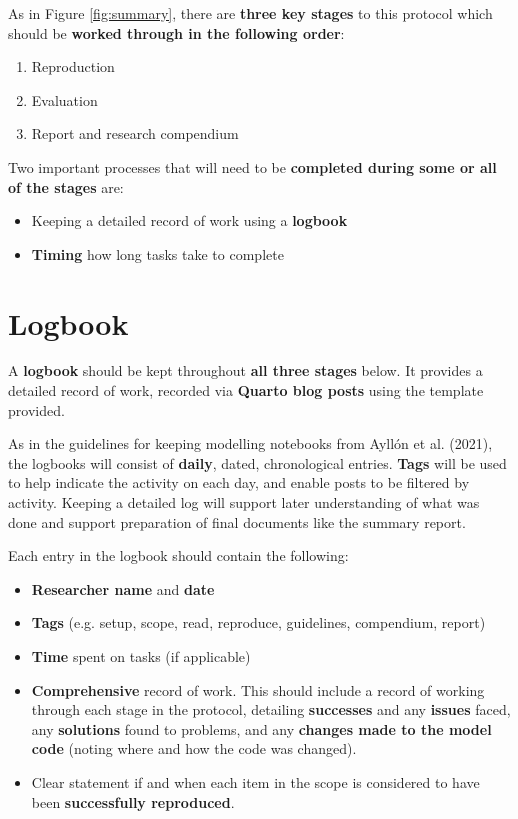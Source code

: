 As in Figure \ref{fig:summary}, there are \textbf{three key stages} to this protocol which should be \textbf{worked through in the following order}:
\begin{enumerate}
    \item Reproduction
    \item Evaluation
    \item Report and research compendium
\end{enumerate}

Two important processes that will need to be \textbf{completed during some or all of the stages} are:
\begin{itemize}
    \item Keeping a detailed record of work using a \textbf{logbook}
    \item \textbf{Timing} how long tasks take to complete
\end{itemize}

\vspace{1cm}
\section{Logbook}

A \textbf{logbook} should be kept throughout \textbf{all three stages} below. It provides a detailed record of work, recorded via \textbf{Quarto blog posts} using the template provided.\autocite{heather_template_2024}

As in the guidelines for keeping modelling notebooks from Ayllón et al. (2021),\autocite{ayllon_keeping_2021} the logbooks will consist of \textbf{daily}, dated, chronological entries. \textbf{Tags} will be used to help indicate the activity on each day, and enable posts to be filtered by activity.\autocite{ayllon_keeping_2021} Keeping a detailed log will support later understanding of what was done and support preparation of final documents like the summary report.

Each entry in the logbook should contain the following:
\begin{itemize}
    \item \textbf{Researcher name} and \textbf{date}
    \item \textbf{Tags} (e.g. setup, scope, read, reproduce, guidelines, compendium, report)
    \item \textbf{Time} spent on tasks (if applicable)
    \item \textbf{Comprehensive} record of work. This should include a record of working through each stage in the protocol, detailing \textbf{successes} and any \textbf{issues} faced, any \textbf{solutions} found to problems, and any \textbf{changes made to the model code} (noting where and how the code was changed).
    \item Clear statement if and when each item in the scope is considered to have been \textbf{successfully reproduced}.
\end{itemize}

